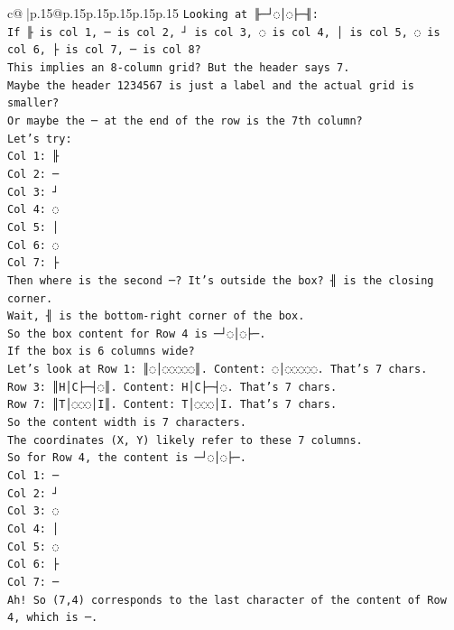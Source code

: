 \documentclass{article}
\begin{document}
{\begin{supertabular}{c@{$\;$}|p{.15\linewidth}@{}p{.15\linewidth}p{.15\linewidth}p{.15\linewidth}p{.15\linewidth}p{.15\linewidth}}
{{{\texttt{Looking at ╟─┘◌│◌├─╢:} \\
\texttt{If ╟ is col 1, ─ is col 2, ┘ is col 3, ◌ is col 4, │ is col 5, ◌ is col 6, ├ is col 7, ─ is col 8?} \\
\texttt{This implies an 8{-}column grid? But the header says 7.} \\
\texttt{Maybe the header 1234567 is just a label and the actual grid is smaller?} \\
\texttt{Or maybe the ─ at the end of the row is the 7th column?} \\
\texttt{Let's try:} \\
\texttt{Col 1: ╟} \\
\texttt{Col 2: ─} \\
\texttt{Col 3: ┘} \\
\texttt{Col 4: ◌} \\
\texttt{Col 5: │} \\
\texttt{Col 6: ◌} \\
\texttt{Col 7: ├} \\
\texttt{Then where is the second ─? It's outside the box? ╢ is the closing corner.} \\
\texttt{Wait, ╢ is the bottom{-}right corner of the box.} \\
\texttt{So the box content for Row 4 is ─┘◌│◌├─.} \\
\texttt{If the box is 6 columns wide?} \\
\texttt{Let's look at Row 1: ║◌│◌◌◌◌◌║. Content: ◌│◌◌◌◌◌. That's 7 chars.} \\
\texttt{Row 3: ║H│C├─┤◌║. Content: H│C├─┤◌. That's 7 chars.} \\
\texttt{Row 7: ║T│◌◌◌│I║. Content: T│◌◌◌│I. That's 7 chars.} \\
\texttt{So the content width is 7 characters.} \\
\texttt{The coordinates (X, Y) likely refer to these 7 columns.} \\
\texttt{So for Row 4, the content is ─┘◌│◌├─.} \\
\texttt{Col 1: ─} \\
\texttt{Col 2: ┘} \\
\texttt{Col 3: ◌} \\
\texttt{Col 4: │} \\
\texttt{Col 5: ◌} \\
\texttt{Col 6: ├} \\
\texttt{Col 7: ─} \\
\texttt{Ah! So (7,4) corresponds to the last character of the content of Row 4, which is ─.} \\
}}}
\end{supertabular}}
\end{document}
